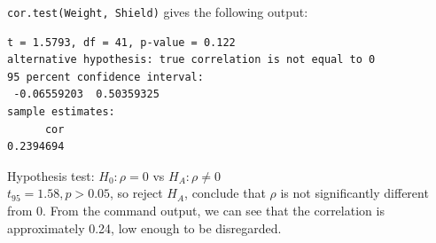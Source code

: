 \documentclass{article}
\begin{document}
\texttt{cor.test(Weight, Shield)} gives the following output:
\begin{verbatim}
t = 1.5793, df = 41, p-value = 0.122
alternative hypothesis: true correlation is not equal to 0
95 percent confidence interval:
 -0.06559203  0.50359325
sample estimates:
      cor 
0.2394694 
\end{verbatim}

Hypothesis test: $H_0:\rho = 0 $ vs $ H_A: \rho \neq 0$ \\
$t_{95}=1.58, p > 0.05$, so reject $H_A$, conclude that $\rho$ is not significantly different from 0. From the command output, we can see that the correlation is approximately 0.24, low enough to be disregarded.
\end{document}

